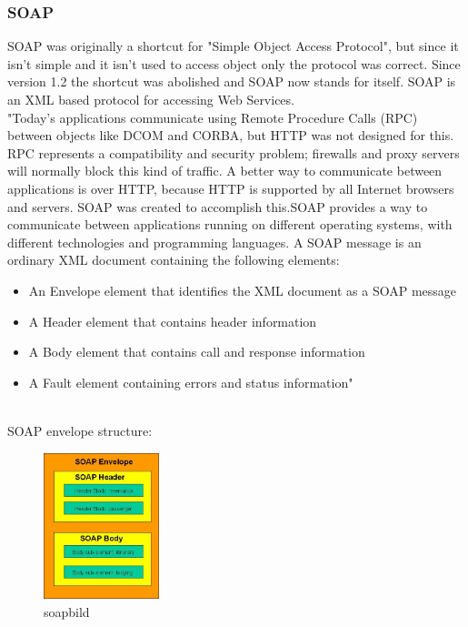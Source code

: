 \documentclass[12pt]{article}
\begin{document}
\subsubsection{SOAP}
SOAP was originally a shortcut for "Simple Object Access Protocol", but since it isn't simple 
and it isn't used to access object only the protocol was correct. Since version 1.2 the shortcut
was abolished and SOAP now stands for itself. SOAP is an XML based protocol for accessing Web Services. \\
"Today's applications communicate using Remote Procedure Calls (RPC) between objects like DCOM and CORBA, but HTTP was not designed for this. RPC represents a compatibility and security problem; firewalls and proxy servers will normally block this kind of traffic. A better way to communicate between applications is over HTTP, because HTTP is supported by all Internet browsers and servers. SOAP was created to accomplish this.SOAP provides a way to communicate between applications running on different operating systems, with different technologies and programming languages. A SOAP message is an ordinary XML document containing the following elements:
\begin{itemize}
\item An Envelope element that identifies the XML document as a SOAP message
\item A Header element that contains header information
\item A Body element that contains call and response information
\item A Fault element containing errors and status information"
\end{itemize}
\cite{soap}\\
SOAP envelope structure:\\

\begin{figure}[here!]
	\centering
	\includegraphics[width=0.3\textwidth]{images/soa_envelope}
	\caption{soapbild}
    \label{fig:Soapenvelope}
	\end{figure}
	\FloatBarrier
\end{document}

